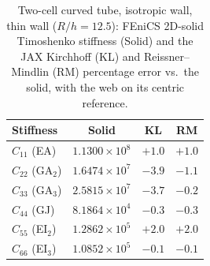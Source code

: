 \begin{table}[htpb]
\centering
\caption{Two-cell curved tube, isotropic wall, thin wall ($R/h = 12.5$): FEniCS 2D-solid Timoshenko stiffness (Solid) and the JAX Kirchhoff (KL) and Reissner--Mindlin (RM) percentage error vs.\ the solid, with the web on its centric reference.}
\label{tab:mc2_iso_thin}
\begin{tabular}{lccc}
\hline
Stiffness & Solid & KL & RM \\
\hline
$C_{11}$ (EA) & $1.1300{\times}10^{8}$ & $+1.0$ & $+1.0$ \\
$C_{22}$ (GA$_2$) & $1.6474{\times}10^{7}$ & $-3.9$ & $-1.1$ \\
$C_{33}$ (GA$_3$) & $2.5815{\times}10^{7}$ & $-3.7$ & $-0.2$ \\
$C_{44}$ (GJ) & $8.1864{\times}10^{4}$ & $-0.3$ & $-0.3$ \\
$C_{55}$ (EI$_2$) & $1.2862{\times}10^{5}$ & $+2.0$ & $+2.0$ \\
$C_{66}$ (EI$_3$) & $1.0852{\times}10^{5}$ & $-0.1$ & $-0.1$ \\
\hline
\end{tabular}
\end{table}
